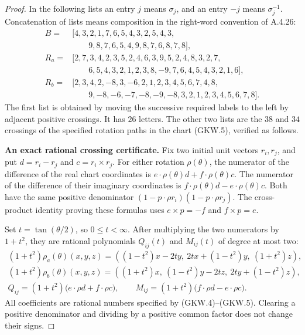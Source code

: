\begin{proof}
In the following lists an entry $j$ means $\sigma_j$,
and an entry $-j$ means $\sigma_j^{-1}$.  Concatenation
of lists means composition in the right-word convention
of A.4.26:
\[
\begin{aligned}
 B={}&[4,3,2,1,7,6,5,4,3,2,5,4,3,\\
      &\qquad 9,8,7,6,5,4,9,8,7,6,8,7,8],\\
 R_a={}&[2,7,3,4,2,3,5,2,4,6,3,9,5,2,4,8,3,2,7,\\
       &\qquad 6,5,4,3,2,1,2,3,8,-9,7,6,4,5,4,3,2,1,6],\\
 R_b={}&[2,3,4,2,-8,3,-6,2,1,2,3,4,5,6,7,4,8,\\
       &\qquad 9,-8,-6,-7,-8,-9,-8,3,2,1,2,3,4,5,6,7,8].
\end{aligned}                                                   \tag{GKW.6}
\]
The first list is obtained by moving the successive
required labels to the left by adjacent positive
crossings.  It has $26$ letters.  The other two lists
are the $38$ and $34$ crossings of the specified rotation
paths in the chart (GKW.5), verified as follows.

\par\medskip\noindent\textbf{An exact rational crossing certificate.}\quad
Fix two initial unit vectors $r_i,r_j$, and put
$d=r_i-r_j$ and $c=r_i\times r_j$.
For either rotation $\rho(\theta)$, the numerator of the
difference of the real chart coordinates is
$e\cdot\rho(\theta)d+f\cdot\rho(\theta)c$.
The numerator of the difference of their imaginary
coordinates is
$f\cdot\rho(\theta)d-e\cdot\rho(\theta)c$.
Both have the same positive denominator
$(1-p\cdot\rho r_i)(1-p\cdot\rho r_j)$.
The cross-product identity proving these formulas uses
$e\times p=-f$ and $f\times p=e$.

Set $t=\tan(\theta/2)$, so $0\leq t<\infty$.
After multiplying the two numerators by $1+t^2$, they
are rational polynomials $Q_{ij}(t)$ and $M_{ij}(t)$
of degree at most two:
\[
\begin{gathered}
 (1+t^2)\rho_a(\theta)(x,y,z)
      =((1-t^2)x-2ty,\ 2tx+(1-t^2)y,\ (1+t^2)z),\\
 (1+t^2)\rho_b(\theta)(x,y,z)
      =((1+t^2)x,\ (1-t^2)y-2tz,\ 2ty+(1-t^2)z),\\
 Q_{ij}=(1+t^2)
          \bigl(e\cdot\rho d+f\cdot\rho c\bigr),\qquad
 M_{ij}=(1+t^2)
          \bigl(f\cdot\rho d-e\cdot\rho c\bigr).
\end{gathered}                                                  \tag{GKW.7}
\]
All coefficients are rational numbers specified by
(GKW.4)--(GKW.5).  Clearing a positive denominator and
dividing by a positive common factor does not change
their signs.


\end{proof}
